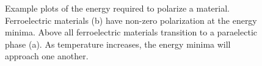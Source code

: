 \begin{figure}[tb]
   \centering
   \caption[Energy vs. Polarization Plots for FE and PE Materials]%
   		{Example plots of the energy required to polarize a material. Ferroelectric materials (b) have %
		non-zero polarization at the energy minima. Above \Tc{} all ferroelectric materials transition %
		to a paraelectic phase (a). As temperature increases, the energy minima will approach one %
		another. }
   \label{fig:EvP}
\end{figure}

